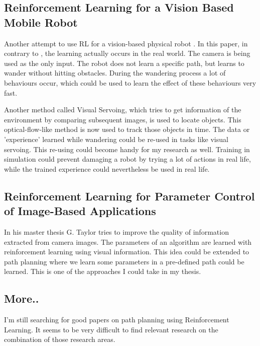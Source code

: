 \documentclass[11pt]{article}
\begin{document}
\subsection*{Reinforcement Learning for a Vision Based Mobile Robot}
Another attempt to use RL for a vision-based physical robot \cite{gaskett}. In this paper, in contrary to \cite{asada}, the learning actually occurs in the real world. The camera is being used as the only input. The robot does not learn a specific path, but learns to wander without hitting obstacles. During the wandering process a lot of behaviours occur, which could be used to learn the effect of these behaviours very fast.

Another method called Visual Servoing, which tries to get information of the environment by comparing subsequent images, is used to locate objects. This optical-flow-like method is now used to track those objects in time. The data or 'experience' learned while wandering could be re-used in tasks like visual servoing. This re-using could become handy for my research as well. Training in simulation could prevent damaging a robot by trying a lot of actions in real life, while the trained experience could nevertheless be used in real life.

\subsection*{Reinforcement Learning for Parameter Control of Image-Based Applications}
In his master thesis \cite{taylor} G. Taylor tries to improve the quality of information extracted from camera images. The parameters of an algorithm are learned with reinforcement learning using visual information. This idea could be extended to path planning where we learn some parameters in a pre-defined path could be learned. This is one of the approaches I could take in my thesis.

\subsection*{More..}
I'm still searching for good papers on path planning using Reinforcement Learning. It seems to be very difficult to find relevant research on the combination of those research areas.




\end{document}
